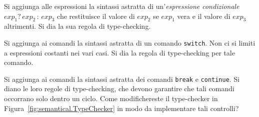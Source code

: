%
\begin{exercise}\label{ex:conditional_expression}
Si aggiunga alle espressioni la sintassi astratta di un'\emph{espressione
condizionale}
$\mathit{exp}_1\mathtt{?}\,\mathit{exp}_2\,\mathtt{:}\,\mathit{exp}_3$
che restituisce il valore di $\mathit{exp}_2$ se $\mathit{exp}_1$ \e
vera e il valore di $\mathit{exp}_3$ altrimenti. Si dia la sua regola di
type-checking.
\end{exercise}
%
\begin{exercise}\label{ex:switch}
Si aggiunga ai comandi la sintassi astratta di un comando \texttt{switch}.
Non ci si limiti a espressioni costanti nei vari casi.
Si dia la regola di type-checking per tale comando.
\end{exercise}
%
\begin{exercise}\label{ex:break_continue}
Si aggiunga ai comandi la sintassi astratta dei comandi
\texttt{break} e \texttt{continue}. Si diano le loro regole di type-checking,
che devono garantire che tali comandi occorrano solo dentro un ciclo.
Come modifichereste il type-checker in Figura~\ref{fig:semantical.TypeChecker}
in modo da implementare tali controlli?
\end{exercise}
